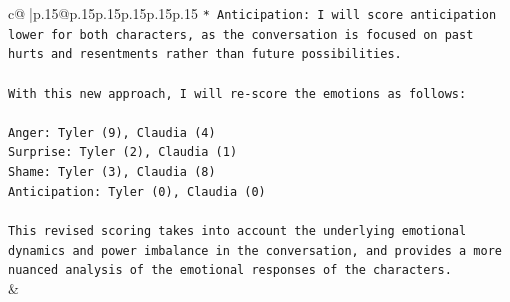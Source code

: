 \documentclass{article}
\begin{document}
{\begin{supertabular}{c@{$\;$}|p{.15\linewidth}@{}p{.15\linewidth}p{.15\linewidth}p{.15\linewidth}p{.15\linewidth}p{.15\linewidth}}
{{{\texttt{* Anticipation: I will score anticipation lower for both characters, as the conversation is focused on past hurts and resentments rather than future possibilities.} \\
\\ 
\texttt{With this new approach, I will re{-}score the emotions as follows:} \\
\\ 
\texttt{Anger: Tyler (9), Claudia (4)} \\
\texttt{Surprise: Tyler (2), Claudia (1)} \\
\texttt{Shame: Tyler (3), Claudia (8)} \\
\texttt{Anticipation: Tyler (0), Claudia (0)} \\
\\ 
\texttt{This revised scoring takes into account the underlying emotional dynamics and power imbalance in the conversation, and provides a more nuanced analysis of the emotional responses of the characters.} \\
            }
        }
    }
    & \\ \\

\end{supertabular}
}
\end{document}
